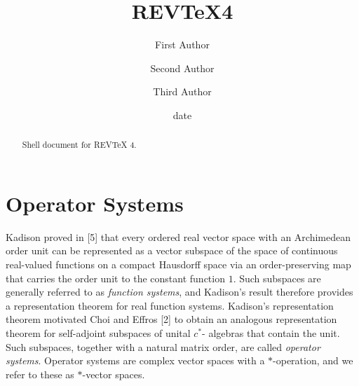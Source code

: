 \documentclass[aps,preprint]{revtex4}%
\begin{document}
\title[Short title for running header]{REV\TeX4}
\author{First Author}
\author{Second Author}
\author{Third Author}

\begin{abstract}
Shell document for REV\TeX{} 4.

\end{abstract}
\date[Date text]{date}




\maketitle
\tableofcontents


\section{Operator Systems}

Kadison proved in [5] that every ordered real vector space with an Archimedean
order unit can be represented as a vector subspace of the space of continuous
real-valued functions on a compact Hausdorff space via an order-preserving map
that carries the order unit to the constant function $1$. Such subspaces are
generally referred to as \emph{function systems}, and Kadison's result
therefore provides a representation theorem for real function systems.
Kadison's representation theorem motivated Choi and Effros [2] to obtain an
analogous representation theorem for self-adjoint subspaces of unital
$c^{\ast}$- algebras that contain the unit. Such subspaces, together with a
natural matrix order, are called \emph{operator systems}. Operator systems are
complex vector spaces with a $\ast$-operation, and we refer to these as $\ast
$-vector spaces.
\end{document}
